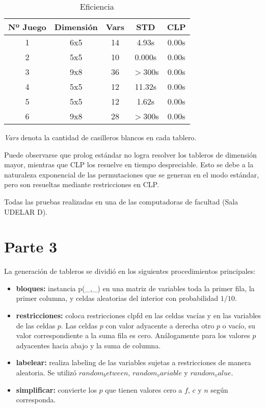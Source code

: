 \documentclass[]{article}
\begin{document}
\begin{table}[h!]
	\begin{center}
		\caption{Eficiencia}
		\label{tab:table1}
		\begin{tabular}{c|c|c|c|c} %
			\textbf{Nº Juego} & \textbf{Dimensión} & \textbf{Vars} & \textbf{STD} & \textbf{CLP} \\
			\hline
			1 & 6x5 & 14 & 4.93s & 0.00s \\
			2 & 5x5 & 10 & 0.000s & 0.00s \\
			3 & 9x8 & 36 & $>$300s & 0.00s \\
			4 & 5x5 & 12 & 11.32s & 0.00s \\
			5 & 5x5 & 12 & 1.62s & 0.00s \\
			6 & 9x8 & 28 & $>$300s & 0.00s \\
		\end{tabular}
	\end{center}
\end{table}
\emph{Vars} denota la cantidad de casilleros blancos en cada tablero.

Puede observarse que prolog estándar no logra resolver los tableros de dimensión mayor, mientras que CLP los resuelve en tiempo despreciable. Esto se debe a la naturaleza exponencial de las permutaciones que se generan en el modo estándar, pero son resueltas mediante restricciones en CLP.

Todas las pruebas realizadas en una de las computadoras de facultad (Sala UDELAR D).
\section{Parte 3}

La generación de tableros se dividió en los siguientes procedimientos principales:

\begin{itemize}
	
	\item{\textbf{bloques:} instancia p(\_,\_) en una matriz de variables toda la primer fila, la primer columna, y celdas aleatorias del interior con probabilidad $1/10$.}
	\item{\textbf{restricciones:} coloca restricciones clpfd en las celdas vacías y en las variables de las celdas $p$. Las celdas $p$ con valor adyacente a derecha otro $p$ o vacío, su valor correspondiente a la suma fila es cero. Análogamente para los valores $p$ adyacentes hacia abajo y la suma de columna.}
	\item{\textbf{labelear:} realiza labeling de las variables sujetas a restricciones de manera aleatoria. Se utilizó $random_between$, $random_variable$ y $random_value$.}
	\item{\textbf{simplificar:} convierte los $p$ que tienen valores cero a $f$, $c$ y $n$ según corresponda.}
\end{itemize}
\end{document}
